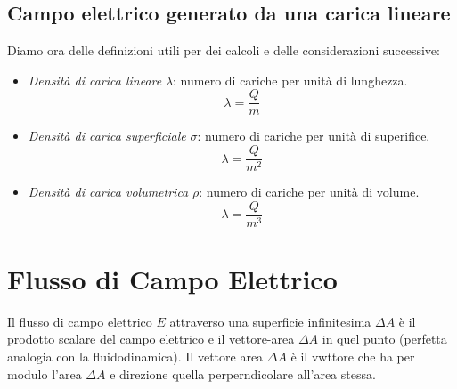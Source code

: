             \subsection{Campo elettrico generato da una carica lineare} Diamo 
            ora delle definizioni utili per dei calcoli e delle considerazioni
            successive:
            \begin{itemize}
                \item \textit{Densità di carica lineare} $\lambda$: numero di 
                cariche per unità di lunghezza.\\
                    \begin{equation}
                        \lambda = \frac{Q}{m}
                    \end{equation}
                \item \textit{Densità di carica superficiale} $\sigma$: numero 
                di cariche per unità di superifice.\\
                    \begin{equation}
                        \lambda = \frac{Q}{m^2}
                    \end{equation}
                \item \textit{Densità di carica volumetrica} $\rho$: numero
                di cariche per unità di volume.\\
                    \begin{equation}
                        \lambda = \frac{Q}{m^3}
                    \end{equation}
            \end{itemize}

        \section{Flusso di Campo Elettrico} Il flusso di campo elettrico $E$ 
        attraverso una superficie infinitesima $\Delta A$ è il prodotto scalare
        del campo elettrico e il vettore-area $\Delta A$ in quel punto 
        (perfetta analogia con la fluidodinamica). Il vettore area $\Delta A$ è
        il vwttore che ha per modulo l'area $\Delta A$ e direzione quella 
        perperndicolare all'area stessa.
